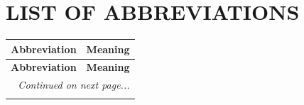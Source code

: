 \chapter*{LIST OF ABBREVIATIONS}

\small
\begin{longtable}{@{}p{} p{}@{}}
\toprule
\textbf{Abbreviation} & \textbf{Meaning} \\
\midrule
\endfirsthead

\toprule
\textbf{Abbreviation} & \textbf{Meaning} \\
\midrule
\endhead

\midrule
\multicolumn{2}{r}{\textit{Continued on next page...}} \\
\bottomrule
\endfoot

\bottomrule
\endlastfoot


\end{longtable}
